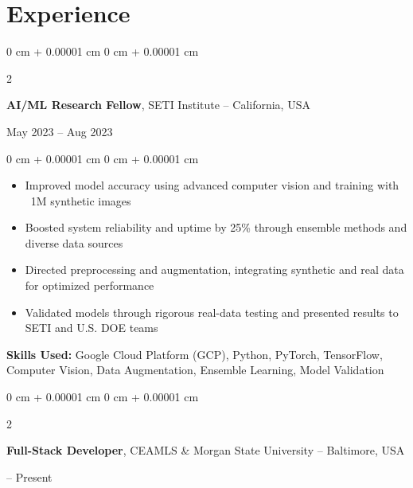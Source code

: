 \documentclass[10pt, letterpaper]{article}
\newenvironment{highlights}{
    \begin{itemize}[
        topsep=0.10 cm,
        parsep=0.10 cm,
        partopsep=0pt,
        itemsep=0pt,
        leftmargin=0 cm + 10pt
    ]
}{
    \end{itemize}
} %
\newenvironment{onecolentry}{
    \begin{adjustwidth}{
        0 cm + 0.00001 cm
    }{
        0 cm + 0.00001 cm
    }
}{
    \end{adjustwidth}
} %
\newenvironment{twocolentry}[2][]{
    \onecolentry
    \def\secondColumn{#2}
    \setcolumnwidth{\fill, 4.5 cm}
    \begin{paracol}{2}
}{
    \switchcolumn \raggedleft \secondColumn
    \end{paracol}
    \endonecolentry
} %
\begin{document}
    
    \section{Experience}
    
    \begin{twocolentry}{
        May 2023 – Aug 2023
    }
        \textbf{AI/ML Research Fellow}, SETI Institute -- California, USA
    \end{twocolentry}
    
    \vspace{0.10 cm}
    \begin{onecolentry}
        \begin{highlights}
            \item Improved model accuracy using advanced computer vision and training with ~1M synthetic images
            \item Boosted system reliability and uptime by 25\% through ensemble methods and diverse data sources
            \item Directed preprocessing and augmentation, integrating synthetic and real data for optimized performance
            \item Validated models through rigorous real-data testing and presented results to SETI and U.S. DOE teams
        \end{highlights}
        \vspace{0.05 cm}
        \textbf{Skills Used:} Google Cloud Platform (GCP), Python, PyTorch, TensorFlow, Computer Vision, Data Augmentation, Ensemble Learning, Model Validation
    \end{onecolentry}

    \vspace{0.25 cm}

    \begin{twocolentry}{
        2022 – Present
    }
        \textbf{Full-Stack Developer}, CEAMLS \& Morgan State University -- Baltimore, USA
    \end{twocolentry}
\end{document}
